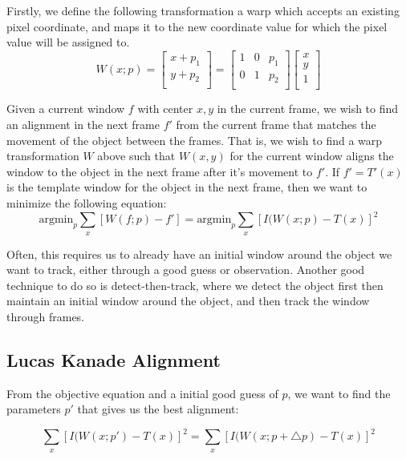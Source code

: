 \documentclass[12pt]{article}
\begin{document}
Firstly, we define the following transformation a warp which accepts an existing pixel coordinate, and maps it to the new coordinate value for which the pixel value will be assigned to.
\begin{equation*}
W(x;p) = \begin{bmatrix}
x + p_1\\
y + p_2\\
\end{bmatrix} = \begin{bmatrix}
1 & 0 & p_1\\
0 & 1 & p_2\\
\end{bmatrix} \begin{bmatrix}
x \\
y \\
1 \\
\end{bmatrix}
\end{equation*}

Given a current window $f$ with center $x, y$ in the current frame, we wish to find an alignment in the next frame $f'$ from the current frame that matches the movement of the object between the frames. That is, we wish to find a warp transformation $W$ above such that $W(x, y)$ for the current window aligns the window to the object in the next frame after it's movement to $f'$. If $f' = T'(x)$ is the template window for the object in the next frame, then we want to minimize the following equation:
\begin{equation*}
\text{argmin}_p \sum_x [W(f;p) - f'] = \text{argmin}_p \sum_x [I(W(x;p) - T(x)]^2
\end{equation*} 

Often, this requires us to already have an initial window around the object we want to track, either through a good guess or observation. Another good technique to do so is detect-then-track, where we detect the object first then maintain an initial window around the object, and then track the window through frames.

\subsection{Lucas Kanade Alignment}

From the objective equation and a initial good guess of $p$, we want to find the parameters $p'$ that gives us the best alignment:

\begin{equation*}
\sum_x [I(W(x;p') - T(x)]^2 = \sum_x [I(W(x;p + \triangle p) - T(x)]^2
\end{equation*} 
\end{document}
